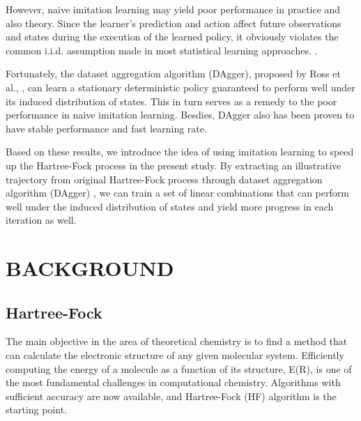 \documentclass[twoside]{article}
\begin{document}


However, naive imitation learning may yield poor performance in practice and also theory.  Since the learner's prediction and action affect future observations and states during the execution of the learned policy, it obviously violates the common i.i.d. assumption made in most statistical learning approaches. \cite{Ross}.



Fortunately, the dataset aggregation algorithm (DAgger), proposed by Ross et al., \cite{DAgger}, can learn a stationary deterministic policy guaranteed to perform well under its induced distribution of states. This in turn serves as a remedy to the poor performance in naive imitation learning. Besdies, DAgger also has been proven to have stable performance and fast learning rate. \cite{DAggerCompare}

Based on these results, we introduce the idea of using imitation learning to speed up the Hartree-Fock process in the present study. By extracting an illustrative trajectory from original Hartree-Fock process
through dataset aggregation algorithm (DAgger) \cite{DAgger}, we can train a set of linear combinations that can perform well under the induced distribution of states and yield more progress in each iteration as well. 


\section{BACKGROUND}

\subsection{Hartree-Fock}



The main objective in the area of theoretical chemistry is to find a method that can calculate the electronic structure of any given molecular system. Efficiently computing the energy of a molecule as a function of its structure, E(R), is one of the most fundamental challenges in computational chemistry. Algorithms with sufficient accuracy are now available, and Hartree-Fock (HF) algorithm is the starting point.
\end{document}
